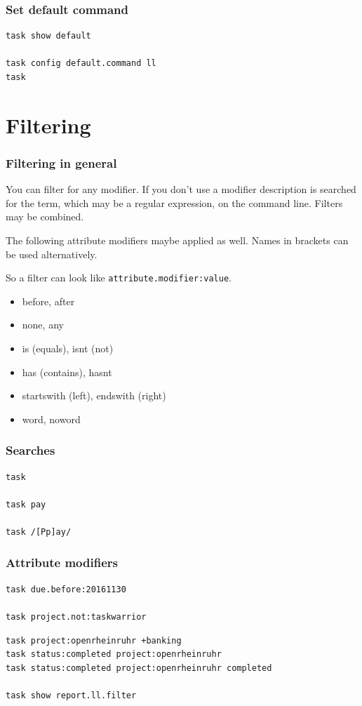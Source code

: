 \documentclass[t,handout]{beamer}
\begin{document}
\begin{frame}[fragile]\frametitle{Set default command}
    \vfill
    \begin{lstlisting}
task show default

task config default.command ll
task\end{lstlisting}
\end{frame}

\section{Filtering}

\begin{frame}[fragile]\frametitle{Filtering in general}
    \vfill
    You can filter for any modifier. If you don't use a modifier description is searched for the term, which may be a regular expression, on the command line. Filters may be combined.

    The following attribute modifiers maybe applied as well. Names in brackets can be used alternatively.

    So a filter can look like \verb=attribute.modifier:value=.

    \begin{itemize}
        \item before, after
        \item none, any
        \item is (equals), isnt (not)
        \item has (contains), hasnt
        \item startswith (left), endswith (right)
        \item word, noword
    \end{itemize}
\end{frame}

\begin{frame}[fragile]\frametitle{Searches}
    \vfill
    \begin{lstlisting}
task

task pay

task /[Pp]ay/\end{lstlisting}
\end{frame}

\begin{frame}[fragile]\frametitle{Attribute modifiers}
    \vfill
    \begin{lstlisting}
task due.before:20161130

task project.not:taskwarrior\end{lstlisting} \pause

    \begin{lstlisting}
task project:openrheinruhr +banking
task status:completed project:openrheinruhr
task status:completed project:openrheinruhr completed

task show report.ll.filter\end{lstlisting}
\end{frame}
\end{document}
